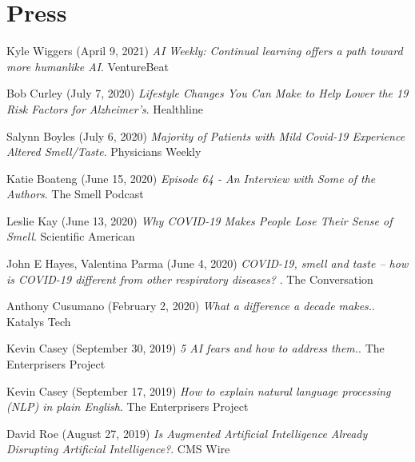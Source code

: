 \documentclass[10pt]{cooperCV2}
\begin{document}
\section{Press}

 
\begin{etaremune}[itemindent=-1.5\bibhang, topsep=0pt,
				   itemsep=\bibsep,partopsep=0pt,parsep=0pt,leftmargin={\bibhang+\widthof{[999]}}] 
    
    
    \item Kyle Wiggers (April 9, 2021) \textit{AI Weekly: Continual learning offers a path toward more humanlike AI}. VentureBeat
     
	
    \item Bob Curley (July 7, 2020) \textit{Lifestyle Changes You Can Make to Help Lower the 19 Risk Factors for Alzheimer’s}. Healthline
     
	
    \item Salynn Boyles (July 6, 2020) \textit{Majority of Patients with Mild Covid-19 Experience Altered Smell/Taste}. Physicians Weekly
     
	
    \item Katie Boateng (June 15, 2020) \textit{Episode 64 - An Interview with Some of the Authors}. The Smell Podcast
     
	
    \item Leslie Kay (June 13, 2020) \textit{Why COVID-19 Makes People Lose Their Sense of Smell}. Scientific American
     
	
    \item John E Hayes, Valentina Parma (June 4, 2020) \textit{COVID-19, smell and taste – how is COVID-19 different from other respiratory diseases? }. The Conversation
     
	
    \item Anthony Cusumano (February 2, 2020) \textit{What a difference a decade makes.}. Katalys Tech
     
	
    \item Kevin Casey (September 30, 2019) \textit{5 AI fears and how to address them.}. The Enterprisers Project
     
	
    \item Kevin Casey (September 17, 2019) \textit{How to explain natural language processing (NLP) in plain English}. The Enterprisers Project
     
	
    \item David Roe (August 27, 2019) \textit{Is Augmented Artificial Intelligence Already Disrupting Artificial Intelligence?}. CMS Wire
     

\end{etaremune}
\end{document}
